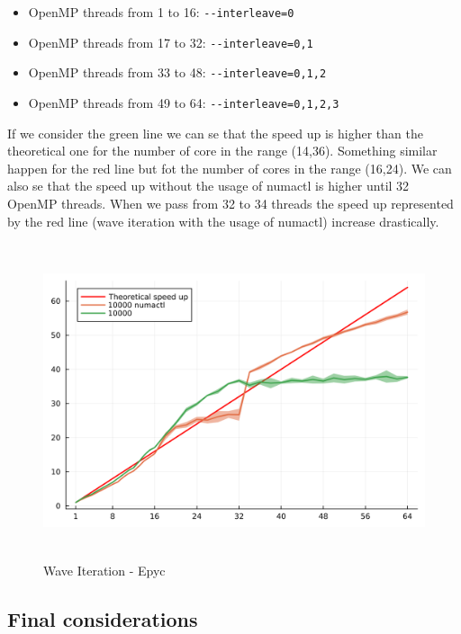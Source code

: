 \documentclass[
  letterpaper,
  DIV=11,
  numbers=noendperiod]{scrartcl}
\providecommand{\tightlist}{%
  \setlength{\itemsep}{0pt}\setlength{\parskip}{0pt}}\usepackage{longtable,booktabs,array}
\begin{document}
\begin{itemize}
\tightlist
\item
  OpenMP threads from 1 to 16: \texttt{-\/-interleave=0}
\item
  OpenMP threads from 17 to 32: \texttt{-\/-interleave=0,1}
\item
  OpenMP threads from 33 to 48: \texttt{-\/-interleave=0,1,2}
\item
  OpenMP threads from 49 to 64: \texttt{-\/-interleave=0,1,2,3}
\end{itemize}

If we consider the green line we can se that the speed up is higher than
the theoretical one for the number of core in the range (14,36).
Something similar happen for the red line but fot the number of cores in
the range (16,24). We can also se that the speed up without the usage of
numactl is higher until 32 OpenMP threads. When we pass from 32 to 34
threads the speed up represented by the red line (wave iteration with
the usage of numactl) increase drastically.

\begin{figure}

{\centering \includegraphics[width=\textwidth,height=3.64583in]{img/wave_scalability.png}

}

\caption{Wave Iteration - Epyc}

\end{figure}

\hypertarget{final-considerations}{%
\subsection{Final considerations}\label{final-considerations}}
\end{document}
